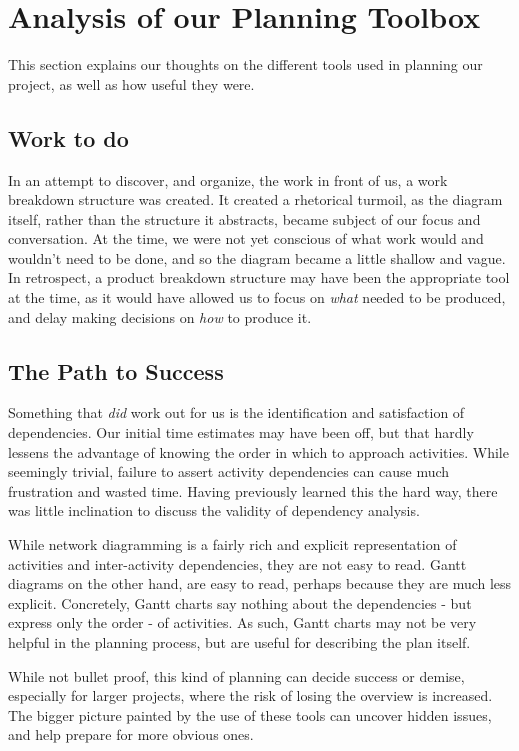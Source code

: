 \section{Analysis of our Planning Toolbox}
This section explains our thoughts on the different tools used in planning our project, as well as how useful they were.
\label{sec:AnalysisPlanning}
\subsection{Work to do}
In an attempt to discover, and organize, the work in front of us, a work
breakdown structure was created. It created a rhetorical turmoil, as the
diagram itself, rather than the structure it abstracts, became subject of our
focus and conversation. At the time, we were not yet conscious of what work
would and wouldn't need to be done, and so the diagram became a little shallow
and vague. In retrospect, a product breakdown structure may have been the
appropriate tool at the time, as it would have allowed us to focus on
\emph{what} needed to be produced, and delay making decisions on \emph{how} to
produce it\cite[ch.~8.3,~8.4]{caye}.

\subsection{The Path to Success}
Something that \emph{did} work out for us is the identification and satisfaction
of dependencies. Our initial time estimates may have been off, but that hardly
lessens the advantage of knowing the order in which to approach activities.
While seemingly trivial, failure to assert activity dependencies can cause much
frustration and wasted time. Having previously learned this the hard way, there
was little inclination to discuss the validity of dependency analysis.

While network diagramming is a fairly rich and explicit representation of
activities and inter-activity dependencies, they are not easy to read.  Gantt
diagrams on the other hand, are easy to read, perhaps because they are much less
explicit. Concretely, Gantt charts say nothing about the dependencies - but
express only the order - of activities. As such, Gantt charts may not be very
helpful in the planning process, but are useful for describing the plan itself.
\cite[ch.~8.6]{caye}

While not bullet proof, this kind of planning can decide success or
demise\cite[ch.~8]{caye}, especially for larger projects, where the risk of
losing the overview is increased. The bigger picture painted by the use of
these tools can uncover hidden issues, and help prepare for more obvious ones.
